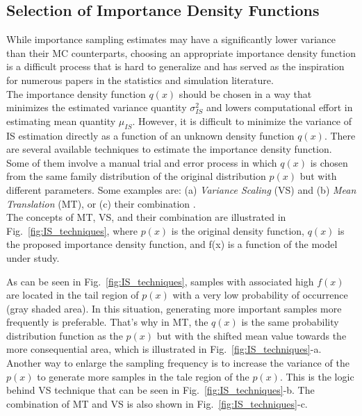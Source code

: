     \subsection{Selection of Importance Density Functions}
        While importance sampling estimates may have a significantly lower variance than their MC counterparts, choosing an appropriate importance density function is a difficult process that is hard to generalize and has served as the inspiration for numerous papers in the statistics and simulation literature. \\
        The importance density function $q(x)$ should be chosen in a way that minimizes the estimated variance quantity $\sigma_{IS}^2$ and lowers computational effort in estimating mean quantity $\mu_{IS}$. However, it is difficult to minimize the variance of IS estimation directly as a function of an unknown density function $q(x)$. There are several available techniques to estimate the importance density function. Some of them involve a manual trial and error process in which $q(x)$ is chosen from the same family distribution of the original distribution $p(x)$ but with different parameters. Some examples are: (a) \textit{Variance Scaling} (VS) and (b) \textit{Mean Translation} (MT), or (c) their combination \cite{lu_improved_1988}. \\
        The concepts of MT, VS, and their combination are illustrated in Fig.~\ref{fig:IS_techniques}, where $p(x)$ is the original density function, $q(x)$ is the proposed importance density function, and f(x) is a function of the model under study. 
        
        
        
        As can be seen in Fig.~\ref{fig:IS_techniques}, samples with associated high $f(x)$ are located in the tail region of $p(x)$ with a very low probability of occurrence (gray shaded area). In this situation, generating more important samples more frequently is preferable. That's why in MT, the $q(x)$ is the same probability distribution function as the $p(x)$ but with the shifted mean value towards the more consequential area, which is illustrated in Fig.~\ref{fig:IS_techniques}-a. Another way to enlarge the sampling frequency is to increase the variance of the $p(x)$ to generate more samples in the tale region of the $p(x)$. This is the logic behind VS technique that can be seen in Fig.~\ref{fig:IS_techniques}-b. The combination of MT and VS is also shown in Fig.~\ref{fig:IS_techniques}-c.
    	
